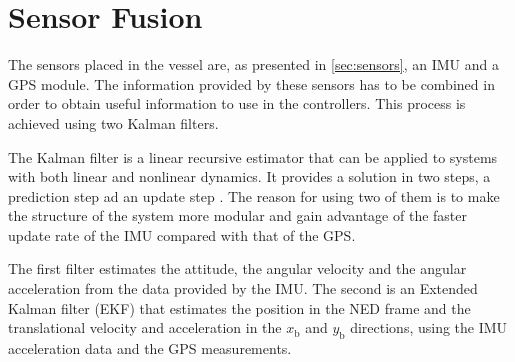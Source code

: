 \chapter{Sensor Fusion}\label{chap:sensorFusion}
The sensors placed in the vessel are, as presented in \autoref{sec:sensors}, an IMU and a GPS module. The information provided by these sensors has to be combined in order to obtain useful information to use in the controllers. This process is achieved using two Kalman filters. 

The Kalman filter is a linear recursive estimator that can be applied to systems with both linear and nonlinear dynamics. It provides a solution in two steps, a prediction step ad an update step \cite{KalmanFiltering}. The reason for using two of them is to make the structure of the system more modular and gain advantage of the faster update rate of the IMU compared with that of the GPS.

The first filter estimates the attitude, the angular velocity and the angular acceleration from the data provided by the IMU. The second is an Extended Kalman filter (EKF) that estimates the position in the NED frame and the translational velocity and acceleration in the $x_\mathrm{b}$ and $y_\mathrm{b}$ directions, using the IMU acceleration data and the GPS measurements.